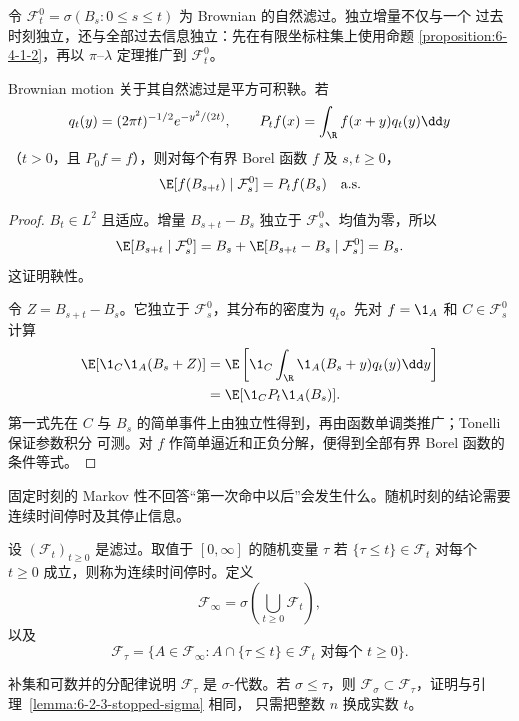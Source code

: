 令 $\mathcal F_t^0=\sigma(B_s:0\le s\le t)$ 为 Brownian 的自然滤过。独立增量不仅与一个
过去时刻独立，还与全部过去信息独立：先在有限坐标柱集上使用命题
\ref{proposition:6-4-1-2}，再以 $\pi$--$\lambda$ 定理推广到 $\mathcal F_t^0$。

\begin{proposition}\label{proposition:6-4-1-3}
Brownian motion 关于其自然滤过是平方可积鞅。若
\[
 q_t(y)=(2\pi t)^{-1/2}e^{-y^2/(2t)},\qquad
 P_tf(x)=\int_\R f(x+y)q_t(y)\dd y
\]
（$t>0$，且 $P_0f=f$），则对每个有界 Borel 函数 $f$ 及 $s,t\ge0$，
\[
 \E[f(B_{s+t})\mid\mathcal F_s^0]=P_tf(B_s)\quad\text{a.s.}
\]
\end{proposition}

\begin{proof}
$B_t\in L^2$ 且适应。增量 $B_{s+t}-B_s$ 独立于 $\mathcal F_s^0$、均值为零，所以
\[
 \E[B_{s+t}\mid\mathcal F_s^0]
 =B_s+\E[B_{s+t}-B_s\mid\mathcal F_s^0]=B_s.
\]
这证明鞅性。

令 $Z=B_{s+t}-B_s$。它独立于 $\mathcal F_s^0$，其分布的密度为 $q_t$。先对
$f=\1_A$ 和 $C\in\mathcal F_s^0$ 计算
\begin{align*}
 \E[\1_C\1_A(B_s+Z)]
 &=\E\left[\1_C\int_\R\1_A(B_s+y)q_t(y)\dd y\right]\\
 &=\E[\1_C P_t\1_A(B_s)].
\end{align*}
第一式先在 $C$ 与 $B_s$ 的简单事件上由独立性得到，再由函数单调类推广；Tonelli 保证参数积分
可测。对 $f$ 作简单逼近和正负分解，便得到全部有界 Borel 函数的条件等式。
\end{proof}

固定时刻的 Markov 性不回答“第一次命中以后”会发生什么。随机时刻的结论需要连续时间停时及其停止信息。

\begin{definition}[连续时间停时与停止信息]\label{def:6-4-1-continuous-stopping}
设 $(\mathcal F_t)_{t\ge0}$ 是滤过。取值于 $[0,\infty]$ 的随机变量 $\tau$ 若
$\{\tau\le t\}\in\mathcal F_t$ 对每个 $t\ge0$ 成立，则称为连续时间停时。定义
\[
 \mathcal F_\infty=\sigma\!\left(\bigcup_{t\ge0}\mathcal F_t\right),
\]
以及
\[
 \mathcal F_\tau=
 \{A\in\mathcal F_\infty:
 A\cap\{\tau\le t\}\in\mathcal F_t\text{ 对每个 }t\ge0\}.
\]
\end{definition}

补集和可数并的分配律说明 $\mathcal F_\tau$ 是 $\sigma$-代数。若 $\sigma\le\tau$，则
$\mathcal F_\sigma\subset\mathcal F_\tau$，证明与引理~\ref{lemma:6-2-3-stopped-sigma} 相同，
只需把整数 $n$ 换成实数 $t$。

